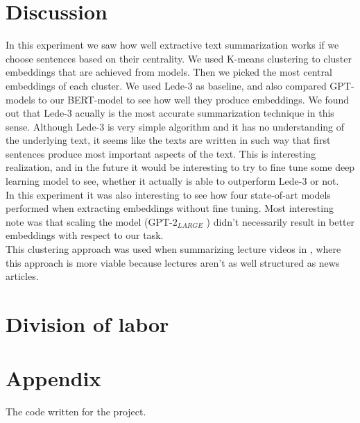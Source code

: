 \documentclass{article}
\newcommand{\gptlarge}{$\text{GPT-2}_{LARGE}$ }
\begin{document}
\clearpage
\section{Discussion}

\noindent
In this experiment we saw how well extractive text summarization works if we choose sentences based on their centrality. We used K-means clustering to cluster embeddings that are achieved from models. Then we picked the most central embeddings of each cluster. We used Lede-3 as baseline, and also compared GPT-models to our BERT-model to see how well they produce embeddings. We found out that Lede-3 acually is the most accurate summarization technique in this sense. Although Lede-3 is very simple algorithm and it has no understanding of the underlying text, it seems like the texts are written in such way that first sentences produce most important aspects of the text. This is interesting realization, and in the future it would be interesting to try to fine tune some deep learning model to see, whether it actually is able to outperform Lede-3 or not.\\

\noindent
In this experiment it was also interesting to see how four state-of-art models performed when extracting embeddings without fine tuning. Most interesting note was that scaling the model (\gptlarge) didn't necessarily result in better embeddings with respect to our task.\\

\noindent
This clustering approach was used when summarizing lecture videos in \cite{extractive_bert}, where this approach is more viable because lectures aren't as well structured as news articles. 

\clearpage
\section{Division of labor}




\clearpage
\section{Appendix}
The code written for the project. 

\end{document}
